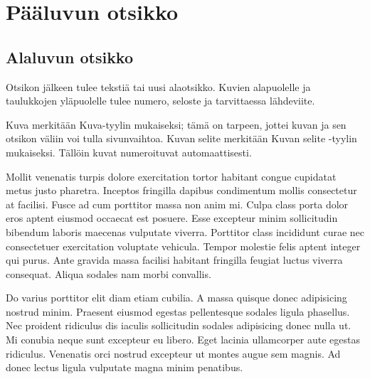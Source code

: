 \chapter{Pääluvun otsikko}

\section{Alaluvun otsikko}
Otsikon jälkeen tulee tekstiä tai uusi alaotsikko. Kuvien alapuolelle ja taulukkojen yläpuolelle tulee numero, seloste ja tarvittaessa lähdeviite.

Kuva merkitään Kuva-tyylin mukaiseksi; tämä on tarpeen, jottei kuvan ja sen otsikon väliin voi tulla sivunvaihtoa. Kuvan selite merkitään Kuvan selite -tyylin mukaiseksi. Tällöin kuvat numeroituvat automaattisesti.

Mollit venenatis turpis dolore exercitation tortor habitant congue cupidatat metus justo pharetra. Inceptos fringilla dapibus condimentum mollis consectetur at facilisi. Fusce ad cum porttitor massa non anim mi. Culpa class porta dolor eros aptent eiusmod occaecat est posuere. Esse excepteur minim sollicitudin bibendum laboris maecenas vulputate viverra. Porttitor class incididunt curae nec consectetuer exercitation voluptate vehicula. Tempor molestie felis aptent integer qui purus. Ante gravida massa facilisi habitant fringilla feugiat luctus viverra consequat. Aliqua sodales nam morbi convallis.

Do varius porttitor elit diam etiam cubilia. A massa quisque donec adipisicing nostrud minim. Praesent eiusmod egestas pellentesque sodales ligula phasellus. Nec proident ridiculus dis iaculis sollicitudin sodales adipisicing donec nulla ut. Mi conubia neque sunt excepteur eu libero. Eget lacinia ullamcorper aute egestas ridiculus. Venenatis orci nostrud excepteur ut montes augue sem magnis. Ad donec lectus ligula vulputate magna minim penatibus.

